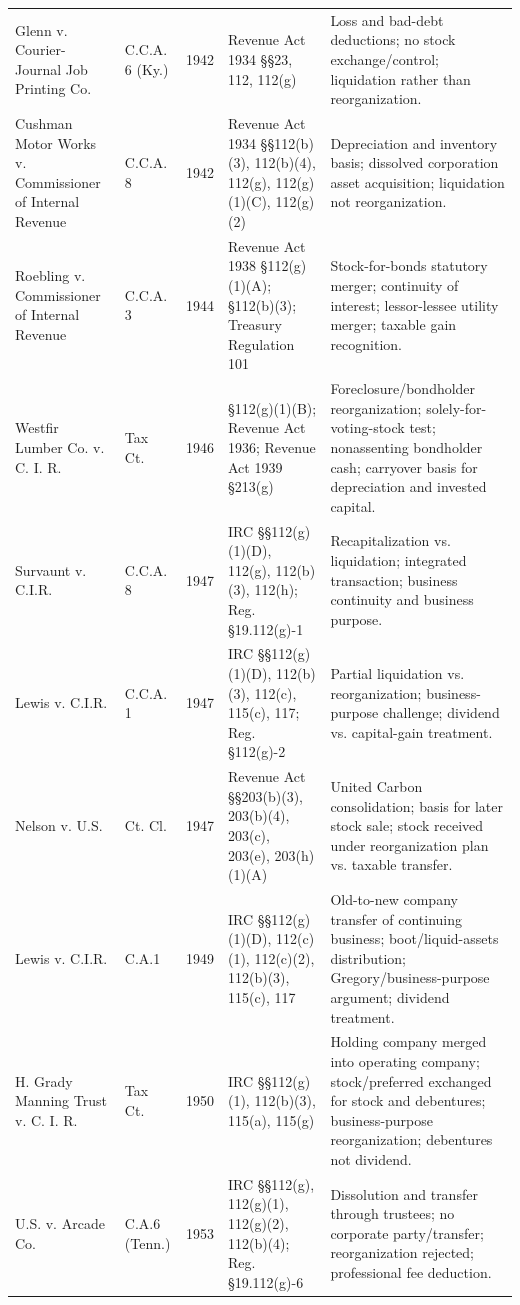 \begin{footnotesize}
\begin{longtable}{p{}p{}p{}p{}p{}}
Glenn v. Courier-Journal Job Printing Co. & C.C.A. 6 (Ky.) & 1942 & Revenue Act 1934 \S\S 23, 112, 112(g) & Loss and bad-debt deductions; no stock exchange/control; liquidation rather than reorganization. \\
Cushman Motor Works v. Commissioner of Internal Revenue & C.C.A. 8 & 1942 & Revenue Act 1934 \S\S 112(b)(3), 112(b)(4), 112(g), 112(g)(1)(C), 112(g)(2) & Depreciation and inventory basis; dissolved corporation asset acquisition; liquidation not reorganization. \\
Roebling v. Commissioner of Internal Revenue & C.C.A. 3 & 1944 & Revenue Act 1938 \S 112(g)(1)(A); \S 112(b)(3); Treasury Regulation 101 & Stock-for-bonds statutory merger; continuity of interest; lessor-lessee utility merger; taxable gain recognition. \\
Westfir Lumber Co. v. C. I. R. & Tax Ct. & 1946 & \S 112(g)(1)(B); Revenue Act 1936; Revenue Act 1939 \S 213(g) & Foreclosure/bondholder reorganization; solely-for-voting-stock test; nonassenting bondholder cash; carryover basis for depreciation and invested capital. \\
Survaunt v. C.I.R. & C.C.A. 8 & 1947 & IRC \S\S 112(g)(1)(D), 112(g), 112(b)(3), 112(h); Reg. \S 19.112(g)-1 & Recapitalization vs. liquidation; integrated transaction; business continuity and business purpose. \\
Lewis v. C.I.R. & C.C.A. 1 & 1947 & IRC \S\S 112(g)(1)(D), 112(b)(3), 112(c), 115(c), 117; Reg. \S 112(g)-2 & Partial liquidation vs. reorganization; business-purpose challenge; dividend vs. capital-gain treatment. \\
Nelson v. U.S. & Ct. Cl. & 1947 & Revenue Act \S\S 203(b)(3), 203(b)(4), 203(c), 203(e), 203(h)(1)(A) & United Carbon consolidation; basis for later stock sale; stock received under reorganization plan vs. taxable transfer. \\
Lewis v. C.I.R. & C.A.1 & 1949 & IRC \S\S 112(g)(1)(D), 112(c)(1), 112(c)(2), 112(b)(3), 115(c), 117 & Old-to-new company transfer of continuing business; boot/liquid-assets distribution; Gregory/business-purpose argument; dividend treatment. \\
H. Grady Manning Trust v. C. I. R. & Tax Ct. & 1950 & IRC \S\S 112(g)(1), 112(b)(3), 115(a), 115(g) & Holding company merged into operating company; stock/preferred exchanged for stock and debentures; business-purpose reorganization; debentures not dividend. \\
U.S. v. Arcade Co. & C.A.6 (Tenn.) & 1953 & IRC \S\S 112(g), 112(g)(1), 112(g)(2), 112(b)(4); Reg. \S 19.112(g)-6 & Dissolution and transfer through trustees; no corporate party/transfer; reorganization rejected; professional fee deduction. \\

\end{longtable}
\end{footnotesize}
